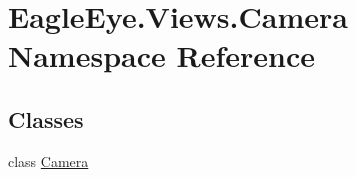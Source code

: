 \hypertarget{namespace_eagle_eye_1_1_views_1_1_camera}{}\section{Eagle\+Eye.\+Views.\+Camera Namespace Reference}
\label{namespace_eagle_eye_1_1_views_1_1_camera}
\subsection*{Classes}
\begin{DoxyCompactItemize}
\item 
class \mbox{\hyperlink{class_eagle_eye_1_1_views_1_1_camera_1_1_camera}{Camera}}
\end{DoxyCompactItemize}
